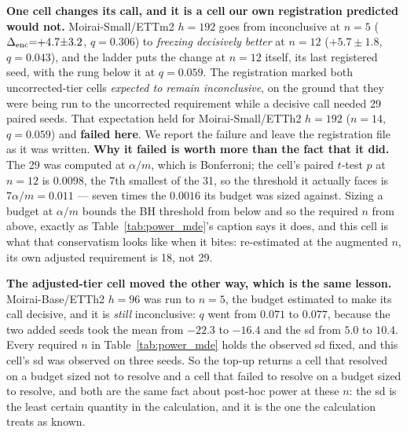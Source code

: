 \textbf{One cell changes its call, and it is a cell our own registration predicted
would not.}  Moirai-Small/ETTm2 $h{=}192$ goes from inconclusive at $n{=}5$
($\Delta_\text{enc}{=}{+}4.7{\pm}3.2$, $q{=}0.306$) to \emph{freezing decisively better} at
$n{=}12$ ($+5.7{\pm}1.8$, $q{=}0.043$), and the ladder puts the change at $n{=}12$
itself, its last registered seed, with the rung below it at $q{=}0.059$.  The
registration marked both uncorrected-tier cells \emph{expected to remain
inconclusive}, on the ground that they were being run to the uncorrected requirement
while a decisive call needed 29 paired seeds.  That expectation held for
Moirai-Small/ETTh2 $h{=}192$ ($n{=}14$, $q{=}0.059$) and \textbf{failed here}.  We
report the failure and leave the registration file as it was written.
\textbf{Why it failed is worth more than the fact that it did.}  The 29 was computed
at $\alpha/m$, which is Bonferroni; the cell's paired $t$-test $p$ at $n{=}12$ is
$0.0098$, the 7th smallest of the 31, so the threshold it actually faces is
$7\alpha/m{=}0.011$ --- seven times the $0.0016$ its budget was sized against.
Sizing a budget at $\alpha/m$ bounds the BH threshold from below and so the required
$n$ from above, exactly as Table~\ref{tab:power_mde}'s caption says it does, and this
cell is what that conservatism looks like when it bites: re-estimated at the
augmented $n$, its own adjusted requirement is 18, not 29.

\textbf{The adjusted-tier cell moved the other way, which is the same lesson.}
Moirai-Base/ETTh2 $h{=}96$ was run to $n{=}5$, the budget estimated to make its call
decisive, and it is \emph{still} inconclusive: $q$ went from $0.071$ to $0.077$,
because the two added seeds took the mean from $-22.3$ to $-16.4$ and the sd from
$5.0$ to $10.4$.  Every required $n$ in Table~\ref{tab:power_mde} holds the observed
sd fixed, and this cell's sd was observed on three seeds.  So the top-up returns a
cell that resolved on a budget sized not to resolve and a cell that failed to resolve
on a budget sized to resolve, and both are the same fact about post-hoc power at
these $n$: the sd is the least certain quantity in the calculation, and it is the one
the calculation treats as known.

